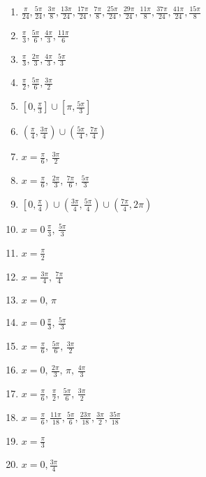 \begin{enumerate}
	\item $\frac{\pi}{24}, \frac{5\pi}{24}, \frac{3\pi}{8}, \frac{13\pi}{24}, \frac{17\pi}{24}, \frac{7\pi}{8}, \frac{25\pi}{24}, \frac{29\pi}{24}, \frac{11\pi}{8}, \frac{37\pi}{24}, \frac{41\pi}{24}, \frac{15\pi}{8}$
    
	\item $\frac{\pi}{3}, \frac{5\pi}{6}, \frac{4\pi}{3}, \frac{11\pi}{6}$
    
	\item $\frac{\pi}{3}, \frac{2\pi}{3}, \frac{4\pi}{3}, \frac{5\pi}{3}$
    
	\item $\frac{\pi}{2}, \frac{5\pi}{6}, \frac{3\pi}{2}$
    
	\item $\left[0, \frac{\pi}{3}\right] \cup \left[\pi, \frac{5\pi}{3}\right]$
    
	\item $\left(\frac{\pi}{4}, \frac{3\pi}{4}\right) \cup \left(\frac{5\pi}{4}, \frac{7\pi}{4}\right)$
	
	\item $x = \frac{\pi}{6}, \, \frac{3\pi}{2}$
	
	\item $x = \frac{\pi}{6}, \, \frac{2\pi}{3}, \, \frac{7\pi}{6}, \, \frac{5\pi}{3}$
	
    \item $\left[0, \frac{\pi}{4}\right) \cup \left(\frac{3\pi}{4}, \frac{5\pi}{4}\right) \cup \left(\frac{7\pi}{4}, 2\pi\right)$
    
    \item $x = 0 \, \frac{\pi}{3}, \, \frac{5\pi}{3}$
    
    \item $x = \frac{\pi}{2}$
    
    \item $x = \frac{3\pi}{4}, \, \frac{7\pi}{4}$
    \item $x = 0, \, \pi$
    \item $x = 0 \, \frac{\pi}{3}, \, \frac{5\pi}{3}$
    \item $x = \frac{\pi}{6}, \, \frac{5\pi}{6}, \, \frac{3\pi}{2}$
    \item $x = 0, \, \frac{2\pi}{3}, \, \pi, \, \frac{4\pi}{3}$
    \item $x = \frac{\pi}{6}, \, \frac{\pi}{2}, \, \frac{5\pi}{6}, \, \frac{3\pi}{2}$
    
    \item $x = \frac{\pi}{6}, \frac{11\pi}{18}, \frac{5\pi}{6}, \frac{23\pi}{18}, \frac{3\pi}{2}, \frac{35\pi}{18} $
    \item $x = \frac{\pi}{3}$
    \item $x = 0, \frac{3\pi}{4}$
\end{enumerate}